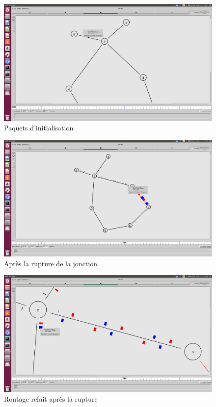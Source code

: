 \documentclass{article}
\begin{document}
    \begin{figure}
    \centering
    \includegraphics[width=0.99\columnwidth]{tp2-1-LS-0-init.png}
    \caption{Paquets d'initialisation}
    \end{figure}
    \begin{figure}
    \centering
    \includegraphics[width=0.99\columnwidth]{tp2-1-LS-1-cut.png}
    \caption{Après la rupture de la jonction}
    \end{figure}
    \begin{figure}
    \centering
    \includegraphics[width=0.99\columnwidth]{tp2-1-LS-2-cut_riggered.png}
    \caption{Routage refait après la rupture}
    \end{figure}
\end{document}
